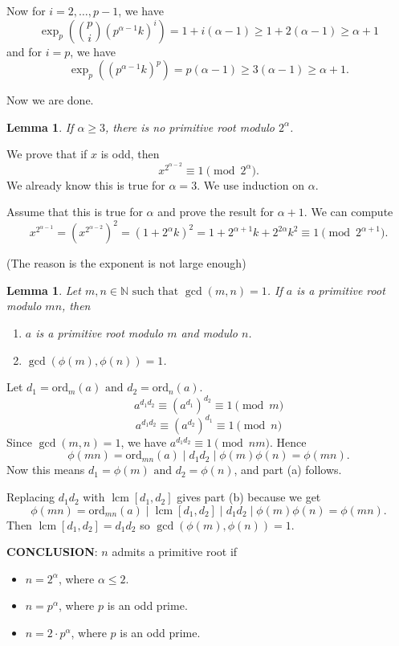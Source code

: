\documentclass[11pt]{article}
\newtheorem{lemma}[thm]{Lemma}
\theoremstyle{definition}
\newcommand{\ord}[0]{\text{ord}}
\newcommand{\nl}[0]{\vspace{12pt}}
\newcommand{\rng}[2]{#1,\dots,#2}
\newcommand{\st}[0]{\text{ such that }}
\newcommand{\et}[0]{\text{ and }}
\DeclareMathOperator{\lcm}{lcm}
\newcommand{\NN}{\mathbb{N}}
\begin{document}
	Now for $i = \rng{2}{p-1}$, we have 
	$$ \exp_p\left(\binom{p}{i}(p^{\alpha-1}k)^i\right) = 1 + i(\alpha-1) \ge 1 + 2(\alpha-1) \ge \alpha+1 $$
	and for $i=p$, we have
	$$ \exp_p((p^{\alpha-1}k)^p) = p(\alpha-1) \ge 3(\alpha-1) \ge \alpha+1. $$

	Now we are done.
	\qedhere

	\begin{lemma}
		If $\alpha \ge 3$, there is no primitive root modulo $2^\alpha$. 
	\end{lemma}
	\proof
		We prove that if $x$ is odd, then 
		$$ x^{2^{\alpha-2}} \equiv 1 \pmod{2^\alpha}. $$
		We already know this is true for $\alpha=3$. 
		We use induction on $\alpha$. 

		Assume that this is true for $\alpha$ and prove the result for $\alpha+1$. 
		We can compute 
		$$ x^{2^{\alpha-1}} = (x^{2^{\alpha-2}})^2 = (1+2^\alpha k)^2 = 1 + 2^{\alpha+1}k + 2^{2\alpha}k^2 \equiv 1 \pmod{2^{\alpha+1}}. $$

		(The reason is the exponent is not large enough)
	\qedhere

	\begin{lemma}
		Let $m,n\in\NN \st \gcd(m,n)=1$. If $a$ is a primitive root modulo $mn$, then
		\begin{enumerate}
			\item[(a)] $a$ is a primitive root modulo $m$ and modulo $n$.
			\item[(b)] $\gcd(\phi(m), \phi(n)) = 1$. 
		\end{enumerate}
	\end{lemma}
	\proof
		Let $d_1 = \ord_m(a) \et d_2 = \ord_n(a)$. 
		$$ a^{d_1d_2} \equiv (a^{d_1})^{d_2} \equiv 1 \pmod{m} $$
		$$ a^{d_1d_2} \equiv (a^{d_2})^{d_1} \equiv 1 \pmod{n} $$
		Since $\gcd(m,n)=1$, we have $a^{d_1d_2} \equiv 1 \pmod{nm}$. Hence 
		$$ \phi(mn) = \ord_{mn}(a) \mid d_1d_2 \mid \phi(m)\phi(n) = \phi(mn). $$
		Now this means $d_1 = \phi(m) \et d_2 = \phi(n)$, and part (a) follows.  

		Replacing $d_1d_2$ with $\lcm[d_1,d_2]$ gives part (b) because we get 
		$$ \phi(mn) = \ord_{mn}(a) \mid \lcm[d_1,d_2] \mid d_1d_2 \mid \phi(m)\phi(n) = \phi(mn). $$
		Then $\lcm[d_1,d_2] = d_1d_2$ so $\gcd(\phi(m), \phi(n)) = 1$. 
	\qedhere

	\nl
	\noindent\textbf{CONCLUSION}: $n$ admits a primitive root if 
	\begin{itemize}
		\item $n = 2^\alpha$, where $\alpha \le 2$.
		\item $n = p^\alpha$, where $p$ is an odd prime.
		\item $n = 2 \cdot p^\alpha$, where $p$ is an odd prime. 
	\end{itemize}
\end{document}
